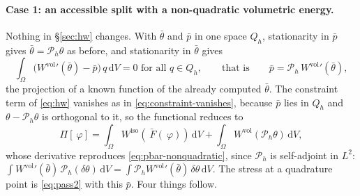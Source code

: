 \documentclass[11pt]{article}
\newcommand{\F}{~F}
\newcommand{\disp}{~\varphi}
\newcommand{\diff}{\,\mathrm{d}}
\newcommand{\supvol}{^{\mathrm{vol}}}
\newcommand{\supiso}{^{\mathrm{iso}}}
\theoremstyle{definition}
\theoremstyle{plain}
\begin{document}
\paragraph{Case 1: an accessible split with a non-quadratic volumetric
energy.} Nothing in \S\ref{sec:hw} changes. With $\bar\theta$ and $\bar p$
in one space $Q_h$, stationarity in $\bar p$ gives $\bar\theta =
\mathcal{P}_h\theta$ as before, and stationarity in $\bar\theta$ gives
\begin{equation}
  \label{eq:pbar-nonquadratic}
  \int_\Omega \big( W\supvol{}'(\bar\theta) - \bar p \big)\, q \diff V = 0
  \text{ for all } q \in Q_h,
  \qquad\text{that is}\qquad
  \bar p = \mathcal{P}_h\, W\supvol{}'(\bar\theta) ,
\end{equation}
the projection of a known function of the already computed $\bar\theta$.
The constraint term of \eqref{eq:hw} vanishes as in
\eqref{eq:constraint-vanishes}, because $\bar p$ lies in $Q_h$ and
$\theta - \mathcal{P}_h\theta$ is orthogonal to it, so the functional
reduces to
\begin{equation}
  \label{eq:collapsed-general}
  \Pi[\disp] = \int_\Omega W\supiso\!\left(\bar{\F}(\disp)\right) \diff V
             + \int_\Omega W\supvol\!\left(\mathcal{P}_h \theta\right) \diff V ,
\end{equation}
whose derivative reproduces \eqref{eq:pbar-nonquadratic}, since
$\mathcal{P}_h$ is self-adjoint in $L^2$: $\int W\supvol{}'(\bar\theta)\,
\mathcal{P}_h(\delta\theta) \diff V = \int \mathcal{P}_h W\supvol{}'(\bar\theta)\,
\delta\theta \diff V$. The stress at a quadrature point is
\eqref{eq:pass2} with this $\bar p$. Four things follow.
\end{document}
